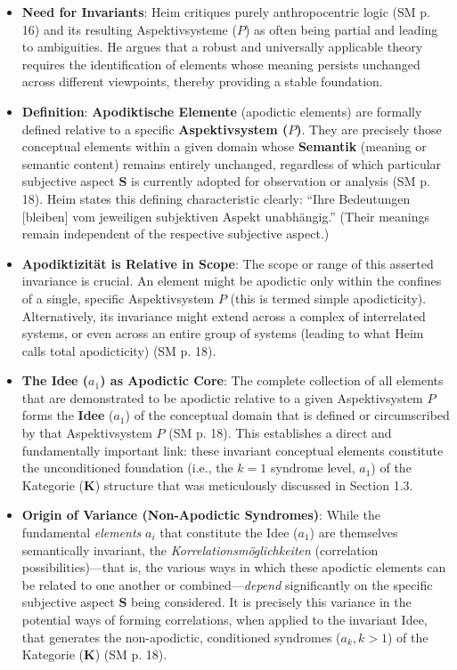 \documentclass[12pt]{article}
\newcommand{\q}[1]{\enquote{#1}}
\newcommand{\kategorie}{\bm{K}}
\newcommand{\conceptualsyndrome}{a} %
\newcommand{\aspektivsystem}{P}
\begin{document}
\begin{itemize}
    \item \textbf{Need for Invariants}: Heim critiques purely anthropocentric logic (SM p. 16) and its resulting Aspektivsysteme (\(\aspektivsystem\)) as often being partial and leading to ambiguities. He argues that a robust and universally applicable theory requires the identification of elements whose meaning persists unchanged across different viewpoints, thereby providing a stable foundation.
    \item \textbf{Definition}: \textbf{Apodiktische Elemente} (apodictic elements) are formally defined relative to a specific \textbf{Aspektivsystem (\(\aspektivsystem\))}. They are precisely those conceptual elements within a given domain whose \textbf{Semantik} (meaning or semantic content) remains entirely unchanged, regardless of which particular subjective aspect \( \mathbf{S} \) is currently adopted for observation or analysis (SM p. 18). Heim states this defining characteristic clearly: \q{Ihre Bedeutungen [bleiben] vom jeweiligen subjektiven Aspekt unabhängig.} (Their meanings remain independent of the respective subjective aspect.)
    \item \textbf{Apodiktizit\"{a}t is Relative in Scope}: The scope or range of this asserted invariance is crucial. An element might be apodictic only within the confines of a single, specific Aspektivsystem \( \aspektivsystem \) (this is termed simple apodicticity). Alternatively, its invariance might extend across a complex of interrelated systems, or even across an entire group of systems (leading to what Heim calls total apodicticity) (SM p. 18).
    \item \textbf{The Idee (\(\conceptualsyndrome_1\)) as Apodictic Core}: The complete collection of all elements that are demonstrated to be apodictic relative to a given Aspektivsystem \( \aspektivsystem \) forms the \textbf{Idee} (\(\conceptualsyndrome_1\)) of the conceptual domain that is defined or circumscribed by that Aspektivsystem \( \aspektivsystem \) (SM p. 18). This establishes a direct and fundamentally important link: these invariant conceptual elements constitute the unconditioned foundation (i.e., the \( k=1 \) syndrome level, \( \conceptualsyndrome_1 \)) of the Kategorie (\(\kategorie\)) structure that was meticulously discussed in Section 1.3.
    \item \textbf{Origin of Variance (Non-Apodictic Syndromes)}: While the fundamental \textit{elements} \( a_i \) that constitute the Idee (\(\conceptualsyndrome_1\)) are themselves semantically invariant, the \textit{Korrelationsmöglichkeiten} (correlation possibilities)—that is, the various ways in which these apodictic elements can be related to one another or combined—\textit{depend} significantly on the specific subjective aspect \( \mathbf{S} \) being considered. It is precisely this variance in the potential ways of forming correlations, when applied to the invariant Idee, that generates the non-apodictic, conditioned syndromes (\( \conceptualsyndrome_k, k>1 \)) of the Kategorie (\(\kategorie\)) (SM p. 18).

\end{itemize}
\end{document}
